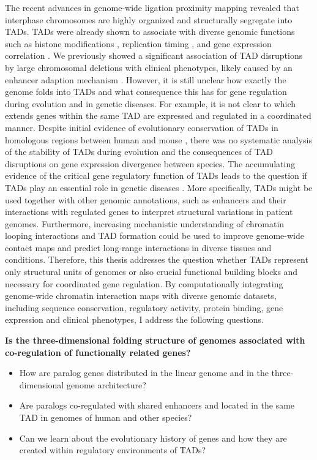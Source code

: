 \documentclass[a4paper,twoside=true,openright,parskip=full,chapterprefix=true,11pt,headings=normal,bibliography=totoc,listof=totoc,titlepage=on,captions=tableabove,draft=false]{scrreprt}
\providecommand{\tightlist}{%
  \setlength{\itemsep}{0pt}\setlength{\parskip}{0pt}}
\theoremstyle{definition}
\theoremstyle{definition}
\theoremstyle{definition}
\theoremstyle{remark}
\begin{document}
The recent advances in genome-wide ligation proximity mapping revealed
that interphase chromosomes are highly organized and structurally
segregate into TADs. TADs were already shown to associate with diverse
genomic functions such as histone modifications
\citep{Dixon2012, Sexton2012}, replication timing \citep{Pope2014}, and
gene expression correlation \citep{Nora2012, LeDily2014}. We previously
showed a significant association of TAD disruptions by large chromosomal
deletions with clinical phenotypes, likely caused by an enhancer
adaption mechanism \citep{Ibn-Salem2014, Lupianez2015}. However, it is
still unclear how exactly the genome folds into TADs and what
consequence this has for gene regulation during evolution and in genetic
diseases. For example, it is not clear to which extends genes within the
same TAD are expressed and regulated in a coordinated manner. Despite
initial evidence of evolutionary conservation of TADs in homologous
regions between human and mouse \citep{Dixon2012, VietriRudan2015},
there was no systematic analysis of the stability of TADs during
evolution and the consequences of TAD disruptions on gene expression
divergence between species. The accumulating evidence of the critical
gene regulatory function of TADs leads to the question if TADs play an
essential role in genetic diseases \citep{Spielmann2016}. More
specifically, TADs might be used together with other genomic
annotations, such as enhancers and their interactions with regulated
genes to interpret structural variations in patient genomes.
Furthermore, increasing mechanistic understanding of chromatin looping
interactions and TAD formation could be used to improve genome-wide
contact maps and predict long-range interactions in diverse tissues and
conditions. Therefore, this thesis addresses the question whether TADs
represent only structural units of genomes or also crucial functional
building blocks and necessary for coordinated gene regulation. By
computationally integrating genome-wide chromatin interaction maps with
diverse genomic datasets, including sequence conservation, regulatory
activity, protein binding, gene expression and clinical phenotypes, I
address the following questions.

\textbf{Is the three-dimensional folding structure of genomes associated
with co-regulation of functionally related genes?}

\begin{itemize}
\tightlist
\item
  How are paralog genes distributed in the linear genome and in the
  three-dimensional genome architecture?
\item
  Are paralogs co-regulated with shared enhancers and located in the
  same TAD in genomes of human and other species?
\item
  Can we learn about the evolutionary history of genes and how they are
  created within regulatory environments of TADs?
\end{itemize}
\end{document}
